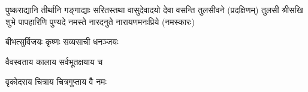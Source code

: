 \twolineshloka
{पुष्कराद्यानि तीर्थानि गङ्गाद्याः सरितस्तथा}
{वासुदेवादयो देवा वसन्ति तुलसीवने}
(प्रदक्षिणम्)
\twolineshloka
{तुलसी श्रीसखि शुभे पापहारिणि पुण्यदे}
{नमस्ते नारदनुते नारायणमनःप्रिये}
 (नमस्कारः)

\closesection


{बीभत्सुर्विजयः कृष्णः सव्यसाची धनञ्जयः}

\closesection


{वैवस्वताय   कालाय   सर्वभूतक्षयाय   च}

{वृकोदराय   चित्राय   चित्रगुप्ताय   वै  नमः}
\closesection
